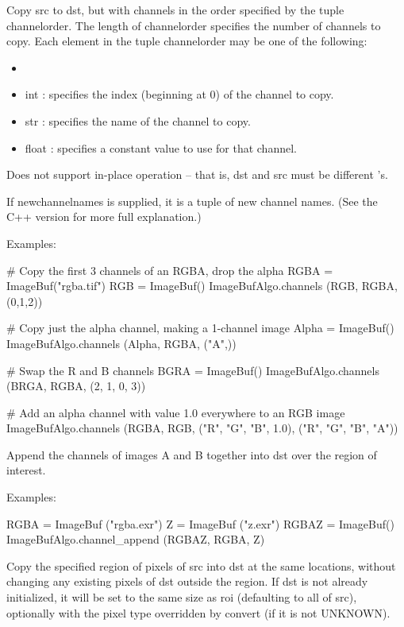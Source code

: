 Copy {\cf src} to {\cf dst}, but with channels in
the order specified by the tuple {\cf channelorder}. 
The length of {\cf channelorder} specifies the number of channels to copy.
Each element in the tuple {\cf channelorder} may be one of the following:
\begin{itemize}
\item {}
\item {\cf int} : specifies the index (beginning at 0) of the channel
    to copy.
\item {\cf str} : specifies the name of the channel to copy.
\item {\cf float} : specifies a constant value to use for that channel.
\end{itemize}

Does not support in-place operation -- that is, {\cf dst} and {\cf src} must
be different \ImageBuf's.

If {\cf newchannelnames} is supplied, it is a tuple of new channel
names. (See the C++ version for more full explanation.)

\smallskip
\noindent Examples:
\begin{code}
    # Copy the first 3 channels of an RGBA, drop the alpha
    RGBA = ImageBuf("rgba.tif")
    RGB = ImageBuf()
    ImageBufAlgo.channels (RGB, RGBA, (0,1,2))

    # Copy just the alpha channel, making a 1-channel image
    Alpha = ImageBuf()
    ImageBufAlgo.channels (Alpha, RGBA, ("A",))

    # Swap the R and B channels
    BGRA = ImageBuf()
    ImageBufAlgo.channels (BRGA, RGBA, (2, 1, 0, 3))

    # Add an alpha channel with value 1.0 everywhere to an RGB image
    ImageBufAlgo.channels (RGBA, RGB, ("R", "G", "B", 1.0),
                            ("R", "G", "B", "A"))
\end{code}
\apiend


 
Append the channels of images {\cf A} and {\cf B} together into {\cf dst} over
the region of interest.

\smallskip
\noindent Examples:
\begin{code}
    RGBA = ImageBuf ("rgba.exr")
    Z = ImageBuf ("z.exr")
    RGBAZ = ImageBuf()
    ImageBufAlgo.channel_append (RGBAZ, RGBA, Z)
\end{code}
\apiend


 
Copy the specified region of pixels of {\cf src} into {\cf dst} at the same
locations, without changing any existing pixels of {\cf dst} outside the
region.  If {\cf dst} is not already initialized, it will be set to the same
size as {\cf roi} (defaulting to all of {\cf src}), optionally with the pixel
type overridden by {\cf convert} (if it is not {\cf UNKNOWN}).

